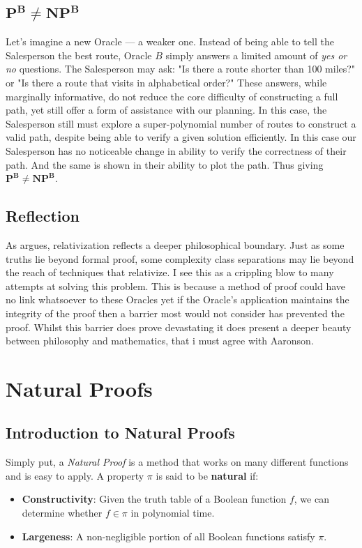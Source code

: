 \documentclass[12pt]{report}
\begin{document}
\section{$\mathbf{P^B \neq NP^B}$}
Let's imagine a new Oracle --- a weaker one.
Instead of being able to tell the Salesperson the best route, Oracle $B$ simply answers a limited amount of \textit{yes or no} questions.
The Salesperson may ask: "Is there a route shorter than 100 miles?" or "Is there a route that visits in alphabetical order?"
These answers, while marginally informative, do not reduce the core difficulty of constructing a full path, yet still offer a form of assistance with our planning.
In this case, the Salesperson still must explore a super-polynomial number of routes to construct a valid path, despite being able to verify a given solution efficiently.
In this case our Salesperson has no noticeable change in ability to verify the correctness of their path.
And the same is shown in their ability to plot the path.
Thus giving $\mathbf{P^B \neq NP^B}$.

\section{Reflection}
As \cite{aaronson2005philosophers} argues, relativization reflects a deeper philosophical boundary.
Just as some truths lie beyond formal proof, some complexity class separations may lie beyond the reach of techniques that relativize.
I see this as a crippling blow to many attempts at solving this problem.
This is because a method of proof could have no link whatsoever to these Oracles yet if the Oracle's application maintains the integrity of the proof then a barrier most would not consider has prevented the proof.
Whilst this barrier does prove devastating it does present a deeper beauty between philosophy and mathematics, that i must agree with Aaronson.

\newpage
\chapter{Natural Proofs}
\section{Introduction to Natural Proofs}
Simply put, a \textit{Natural Proof} is a method that works on many different functions and is easy to apply.  
A property $\mathcal{\pi}$ is said to be \textbf{natural} if:
\begin{itemize}
    \item \textbf{Constructivity}: Given the truth table of a Boolean function $f$, we can determine whether $f \in \mathcal{\pi}$ in polynomial time.
    \item \textbf{Largeness}: A non-negligible portion of all Boolean functions satisfy $\mathcal{\pi}$.
\end{itemize}
\end{document}
